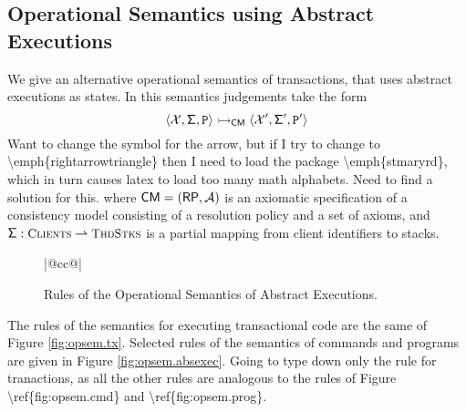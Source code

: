 \subsection{Operational Semantics using Abstract Executions}
We give an alternative operational semantics of transactions, that uses abstract executions as states. 
In this semantics judgements take the form 
\[
\langle \mathcal{X}, \mathsf{\Sigma}, \texttt{P} \rangle \rightarrowtail_{\mathsf{CM}} \langle \mathcal{X}', \mathsf{\Sigma}', \texttt{P}' \rangle
\]
\ac{Want to change the symbol for the arrow, but if I try to change to \emph{rightarrowtriangle} then 
I need to load the package \emph{stmaryrd}, which in turn causes latex to load too many math alphabets. 
Need to find a solution for this.}
where $\mathsf{CM} = (\mathsf{RP}, \mathcal{A})$ is an axiomatic specification of a consistency model
consisting of a resolution policy and a set of axioms, and $\thdstackFun: \tidset \rightharpoonup \ThdStacks$ 
is a partial mapping from client identifiers to stacks.

\begin{figure}
\begin{center}
\begin{tabular}{|@{}cc@{}|}
\end{tabular}
\end{center}
\caption{Rules of the Operational Semantics of Abstract Executions.}
\end{figure}

The rules of the semantics for executing transactional code are the same of Figure \ref{fig:opsem.tx}.
Selected rules of the semantics of commands and programs are given in Figure \ref{fig:opsem.absexec}. 
\ac{Going to type down only the rule for tranactions, as all the other rules are analogous 
to the rules of Figure \ref{fig:opsem.cmd} and \ref{fig:opsem.prog}.}

